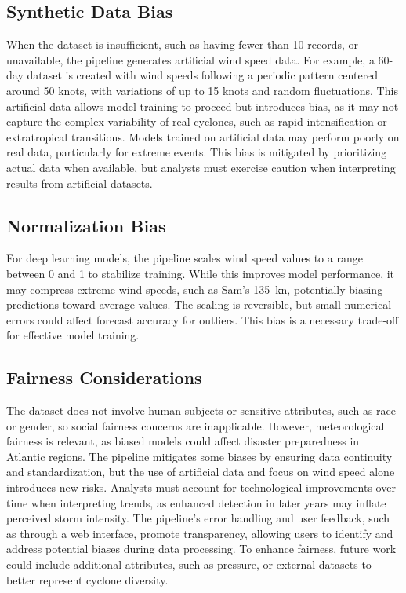 \subsection{Synthetic Data Bias}
When the dataset is insufficient, such as having fewer than 10 records, or unavailable, the pipeline generates artificial wind speed data. For example, a 60-day dataset is created with wind speeds following a periodic pattern centered around 50 knots, with variations of up to 15 knots and random fluctuations. This artificial data allows model training to proceed but introduces bias, as it may not capture the complex variability of real cyclones, such as rapid intensification or extratropical transitions. Models trained on artificial data may perform poorly on real data, particularly for extreme events. This bias is mitigated by prioritizing actual data when available, but analysts must exercise caution when interpreting results from artificial datasets.

\subsection{Normalization Bias}
For deep learning models, the pipeline scales wind speed values to a range between 0 and 1 to stabilize training. While this improves model performance, it may compress extreme wind speeds, such as Sam’s \SI{135}{\knot}, potentially biasing predictions toward average values. The scaling is reversible, but small numerical errors could affect forecast accuracy for outliers. This bias is a necessary trade-off for effective model training.

\subsection{Fairness Considerations}
The dataset does not involve human subjects or sensitive attributes, such as race or gender, so social fairness concerns are inapplicable. However, meteorological fairness is relevant, as biased models could affect disaster preparedness in Atlantic regions. The pipeline mitigates some biases by ensuring data continuity and standardization, but the use of artificial data and focus on wind speed alone introduces new risks. Analysts must account for technological improvements over time when interpreting trends, as enhanced detection in later years may inflate perceived storm intensity. The pipeline’s error handling and user feedback, such as through a web interface, promote transparency, allowing users to identify and address potential biases during data processing. To enhance fairness, future work could include additional attributes, such as pressure, or external datasets to better represent cyclone diversity.

